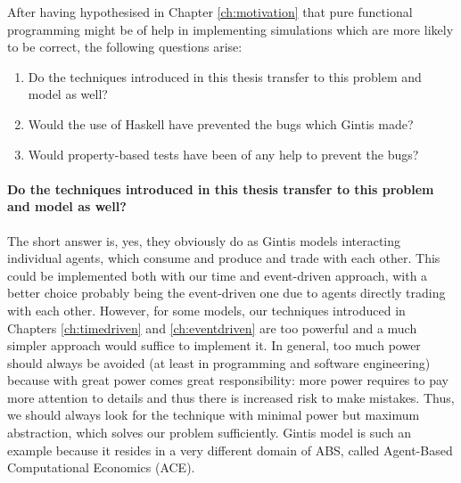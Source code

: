After having hypothesised in Chapter \ref{ch:motivation} that pure functional programming might be of help in implementing simulations which are more likely to be correct, the following questions arise:

\begin{enumerate}
	\item Do the techniques introduced in this thesis transfer to this problem and model as well?
	\item Would the use of Haskell have prevented the bugs which Gintis made?
	\item Would property-based tests have been of any help to prevent the bugs?
\end{enumerate}

\paragraph{Do the techniques introduced in this thesis transfer to this problem and model as well?}
The short answer is, yes, they obviously do as Gintis models interacting individual agents, which consume and produce and trade with each other. This could be implemented both with our time and event-driven approach, with a better choice probably being the event-driven one due to agents directly trading with each other. However, for some models, our techniques introduced in Chapters \ref{ch:timedriven} and \ref{ch:eventdriven} are too powerful and a much simpler approach would suffice to implement it. In general, too much power should always be avoided (at least in programming and software engineering) because with great power comes great responsibility: more power requires to pay more attention to details and thus there is increased risk to make mistakes. Thus, we should always look for the technique with minimal power but maximum abstraction, which solves our problem sufficiently. Gintis model is such an example because it resides in a very different domain of ABS, called Agent-Based Computational Economics (ACE).


